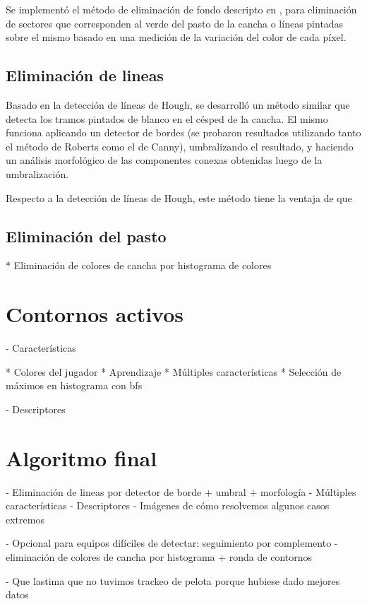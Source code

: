 Se implementó el método de eliminación de fondo descripto en
\cite{papers-tanos}, para eliminación de sectores que corresponden al
verde del pasto de la cancha o líneas pintadas sobre el mismo basado
en una medición de la variación del color de cada píxel.


\subsection{Eliminación de lineas}

Basado en la detección de líneas de Hough, se desarrolló un método similar que
detecta los tramos pintados de blanco en el césped de la cancha. El mismo
funciona aplicando un detector de bordes (se probaron resultados utilizando
tanto el método de Roberts como el de Canny), umbralizando el resultado, y
haciendo un análisis morfológico de las componentes conexas obtenidas luego de
la umbralización.

Respecto a la detección de líneas de Hough, este método tiene la ventaja de que

\subsection{Eliminación del pasto}
  * Eliminación de colores de cancha por histograma de colores

\section{Contornos activos}
\label{sec:ac-extension}

- Características

  * Colores del jugador
  * Aprendizaje
  * Múltiples características
  * Selección de máximos en histograma con bfs

- Descriptores

\section{Algoritmo final}
\label{sec:alg-final}

- Eliminación de lineas por detector de borde + umbral + morfología
- Múltiples características
- Descriptores
- Imágenes de cómo resolvemos algunos casos extremos

- Opcional para equipos difíciles de detectar: seguimiento por complemento
  - eliminación de colores de cancha por histograma + ronda de contornos

- Que lastima que no tuvimos trackeo de pelota porque hubiese dado mejores datos
